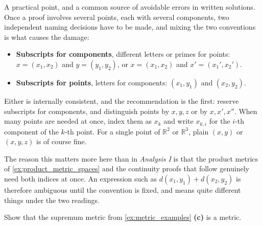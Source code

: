 \begin{remark}
\label{rem:naming_points_and_components}
A practical point, and a common source of avoidable errors in written solutions. Once a proof involves several points, each with several components, two
independent naming decisions have to be made, and mixing the two conventions is what causes the
damage:
\begin{itemize}
  \item \textbf{Subscripts for components}, different letters or primes for points:
    $x = (x_1,x_2)$ and $y = (y_1,y_2)$, or $x = (x_1,x_2)$ and $x' = (x_1',x_2')$.
  \item \textbf{Subscripts for points}, letters for components: $(x_1,y_1)$ and $(x_2,y_2)$.
\end{itemize}
Either is internally consistent, and the recommendation is the first: reserve subscripts for
components, and distinguish points by $x, y, z$ or by $x, x', x''$. When many points are needed
at once, index them as $x_k$ and write $x_{k,i}$ for the $i$-th component of the $k$-th point.
For a single point of $\mathbb{R}^2$ or $\mathbb{R}^3$, plain $(x,y)$ or $(x,y,z)$ is of course
fine.

The reason this matters more here than in \emph{Analysis I} is that the product metrics of
\cref{ex:product_metric_spaces} and the continuity proofs that follow genuinely need both indices at once. An
expression such as $d(x_1,y_1) + d(x_2,y_2)$ is therefore ambiguous until the convention is fixed,
and means quite different things under the two readings.
\end{remark}

\begin{exercise}
\label{ex:sup_metric_is_metric}
Show that the supremum metric from \cref{ex:metric_examples} \textbf{(c)} is a metric.
\end{exercise}

